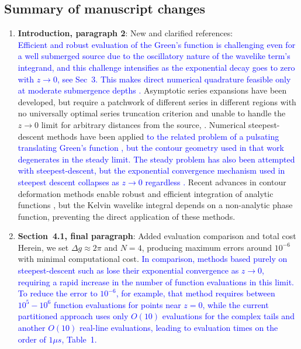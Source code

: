 \documentclass[11pt,a4paper]{article}
\begin{document}
\bigskip

\subsection*{Summary of manuscript changes}

\begin{enumerate}
  \item \textbf{Introduction, paragraph 2}: New and clarified references: \\
  \textcolor{blue}{Efficient and robust evaluation of the Green's function is challenging even for a well submerged source due to the oscillatory nature of the wavelike term's integrand, and this challenge intensifies as the exponential decay goes to zero with $z\to 0$, see Sec~3. This makes direct numerical quadrature feasible only at moderate submergence depths \cite{furth_dissipative_2021}.}  Asymptotic series expansions have been developed, but require a patchwork of different series in different regions with no universally optimal series truncation criterion and unable to handle the $z\to 0$ limit for arbitrary distances from the source, \cite{baar_evaluation_1988, clarisse_evaluation_1994}. Numerical steepest-descent methods have been applied \textcolor{blue}{to the related problem of a pulsating translating Green's function \cite{iwashita_green_1992}, but the contour geometry used in that work degenerates in the steady limit. The steady problem has also been attempted with steepest-descent, but the exponential convergence mechanism used in steepest descent collapses as $z\to 0$ regardless \cite{motygin_numerical_2017}.} Recent advances in contour deformation methods enable robust and efficient integration of analytic functions \cite{gibbs_numerical_2024}, but the Kelvin wavelike integral depends on a non-analytic phase function, preventing the direct application of these methods.
  \item \textbf{Section~4.1, final paragraph}: Added evaluation comparison and total cost\\
  Herein, we set $\Delta g \approx 2\pi$ and $N=4$, producing maximum errors around $10^{-6}$ with minimal computational cost. \textcolor{blue}{In comparison, methods based purely on steepest-descent such as \cite{motygin_numerical_2017} lose their exponential convergence as $z\to 0$, requiring a rapid increase in the number of function evaluations in this limit. To reduce the error to $10^{-6}$, for example, that method requires between $10^5-10^6$ function evaluations for points near $z=0$, while the current partitioned approach uses only $O(10)$ evaluations for the complex tails and another $O(10)$ real-line evaluations, leading to evaluation times on the order of $1\mu s$, Table~1.}
\end{enumerate}



\end{document}

